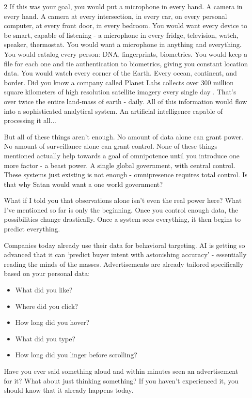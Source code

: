 \documentclass[10pt]{article}
\begin{document}
\begin{multicols}{2}
If this was your goal, you would put a microphone in every hand. A camera in every hand. A camera at every intersection, in every car, on every personal computer, at every front door, in every bedroom. You would want every device to be smart, capable of listening - a microphone in every fridge, television, watch, speaker, thermostat. You would want a microphone in anything and everything. You would catalog every person: DNA, fingerprints, biometrics. You would keep a file for each one and tie authentication to biometrics, giving you constant location data. You would watch every corner of the Earth. Every ocean, continent, and border. Did you know a company called Planet Labs collects over 300 million square kilometers of high resolution satellite imagery every single day \cite{PlanetLabs}. That's over twice the entire land-mass of earth - daily. All of this information would flow into a sophisticated analytical system. An artificial intelligence capable of processing it all...

But all of these things aren't enough. No amount of data alone can grant power. No amount of surveillance alone can grant control. None of these things mentioned actually help towards a goal of omnipotence until you introduce one more factor - a beast power. A single global government, with central control. These systems just existing is not enough - omnipresence requires total control. Is that why Satan would want a one world government?

What if I told you that observations alone isn't even the real power here? What I've mentioned so far is only the beginning. Once you control enough data, the possibilities change drastically. Once a system sees everything, it then begins to predict everything. 

Companies today already use their data for behavioral targeting. AI is getting so advanced that it can `predict buyer intent with astonishing accuracy' - essentially reading the minds of the masses. Advertisements are already tailored specifically based on your personal data:
\begin{itemize}[noitemsep, topsep=0pt]
	\item What did you like? 
	\item Where did you click?
	\item How long did you hover?
	\item What did you type?
	\item How long did you linger before scrolling?
\end{itemize}
Have you ever said something aloud and within minutes seen an advertisement for it? What about just thinking something? If you haven't experienced it, you should know that it already happens today.


\end{multicols}
\end{document}
